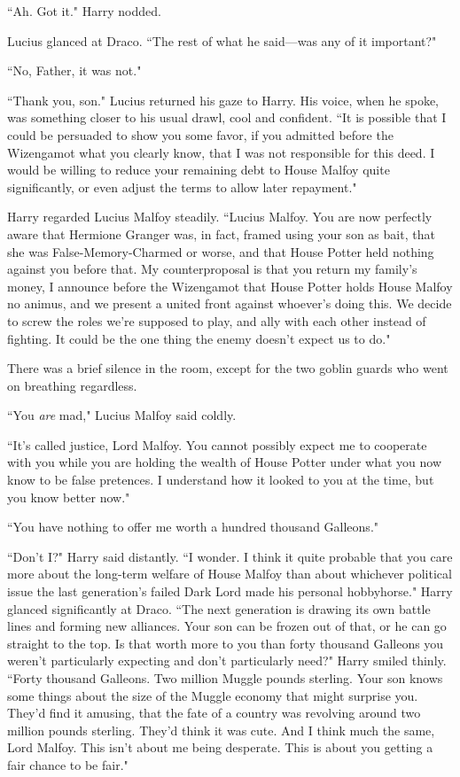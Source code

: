 ``Ah. Got it." Harry nodded.

Lucius glanced at Draco. ``The rest of what he said—was any of it important?"

``No, Father, it was not."

``Thank you, son." Lucius returned his gaze to Harry. His voice, when he spoke, was something closer to his usual drawl, cool and confident. ``It is possible that I could be persuaded to show you some favor, if you admitted before the Wizengamot what you clearly know, that I was not responsible for this deed. I would be willing to reduce your remaining debt to House Malfoy quite significantly, or even adjust the terms to allow later repayment."

Harry regarded Lucius Malfoy steadily. ``Lucius Malfoy. You are now perfectly aware that Hermione Granger was, in fact, framed using your son as bait, that she was False-Memory-Charmed or worse, and that House Potter held nothing against you before that. My counterproposal is that you return my family's money, I announce before the Wizengamot that House Potter holds House Malfoy no animus, and we present a united front against whoever's doing this. We decide to screw the roles we're supposed to play, and ally with each other instead of fighting. It could be the one thing the enemy doesn't expect us to do."

There was a brief silence in the room, except for the two goblin guards who went on breathing regardless.

``You \emph{are} mad," Lucius Malfoy said coldly.

``It's called justice, Lord Malfoy. You cannot possibly expect me to cooperate with you while you are holding the wealth of House Potter under what you now know to be false pretences. I understand how it looked to you at the time, but you know better now."

``You have nothing to offer me worth a hundred thousand Galleons."

``Don't I?" Harry said distantly. ``I wonder. I think it quite probable that you care more about the long-term welfare of House Malfoy than about whichever political issue the last generation's failed Dark Lord made his personal hobbyhorse." Harry glanced significantly at Draco. ``The next generation is drawing its own battle lines and forming new alliances. Your son can be frozen out of that, or he can go straight to the top. Is that worth more to you than forty thousand Galleons you weren't particularly expecting and don't particularly need?" Harry smiled thinly. ``Forty thousand Galleons. Two million Muggle pounds sterling. Your son knows some things about the size of the Muggle economy that might surprise you. They'd find it amusing, that the fate of a country was revolving around two million pounds sterling. They'd think it was cute. And I think much the same, Lord Malfoy. This isn't about me being desperate. This is about you getting a fair chance to be fair."

